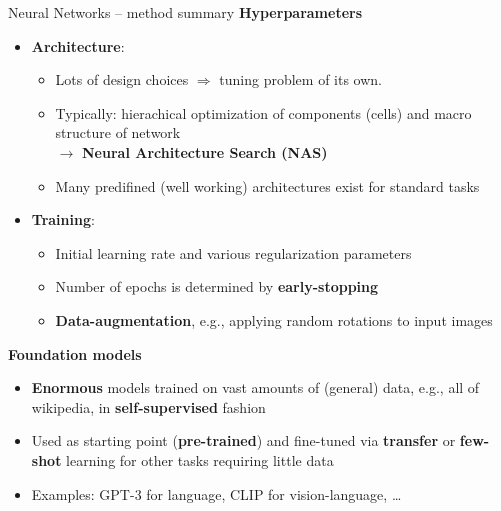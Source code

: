 \documentclass[11pt,compress,t,notes=noshow, xcolor=table]{beamer}
\newcommand{\highlight}[1]{\textcolor{hlcol}{\textbf{#1}}}
\begin{document}
\begin{vbframe}{Neural Networks -- method summary}
\highlight{Hyperparameters}

\begin{itemize}
  \item \textbf{Architecture}:
  \begin{itemize}
    \item Lots of design choices $\Rightarrow$ tuning problem of its own.
    \item Typically: hierachical optimization of components (cells) and macro structure of network\\ 
    $\rightarrow$ \textbf{Neural Architecture Search (NAS)}
    \item Many predifined (well working) architectures exist for standard tasks
  \end{itemize}
  \item \textbf{Training}:
  \begin{itemize}
    \item Initial learning rate and various regularization parameters
    \item Number of epochs is determined by \textbf{early-stopping}
    \item \textbf{Data-augmentation}, e.g., applying random rotations to input images
  \end{itemize}
\end{itemize}

\medskip

\highlight{Foundation models}

\begin{itemize}
    \item \textbf{Enormous} models trained on vast amounts of (general) data, e.g., all of wikipedia, in \textbf{self-supervised} fashion
    \item Used as starting point (\textbf{pre-trained}) and fine-tuned via \textbf{transfer} or \textbf{few-shot} learning for other tasks requiring little data
    \item Examples: GPT-3 for language, CLIP for vision-language, \dots
\end{itemize}



\end{vbframe}
\end{document}
